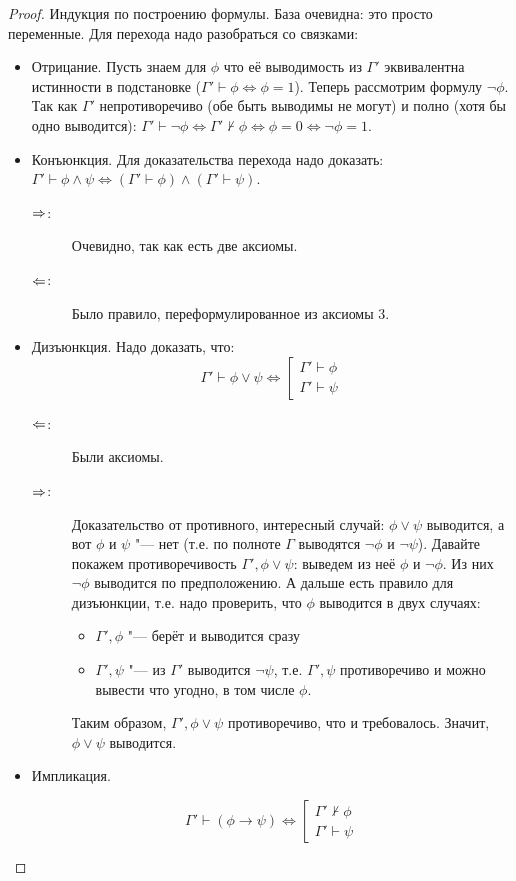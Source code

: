 \begin{proof}
	Индукция по построению формулы.
	База очевидна: это просто переменные.
	Для перехода надо разобраться со связками:
	\begin{itemize}
		\item
			Отрицание.
			Пусть знаем для $\phi$ что её выводимость из $\Gamma'$ эквивалентна истинности в подстановке ($\Gamma' \vdash \phi \iff \phi = 1$).
			Теперь рассмотрим формулу $\lnot \phi$.
			Так как $\Gamma'$ непротиворечиво (обе быть выводимы не могут) и полно (хотя бы одно выводится): $\Gamma' \vdash \lnot \phi \iff \Gamma' \nvdash \phi \iff \phi = 0 \iff \lnot \phi = 1$.
		\item
			Конъюнкция.
			Для доказательства перехода надо доказать:
			$\Gamma' \vdash \phi \land \psi \iff (\Gamma' \vdash \phi) \land (\Gamma' \vdash \psi)$.
			\begin{description}
			\item[$\Rightarrow$:]
				Очевидно, так как есть две аксиомы.
			\item[$\Leftarrow$:]
				Было правило, переформулированное из аксиомы 3.
			\end{description}
		\item
			Дизъюнкция.
			Надо доказать, что:
			\[
				\Gamma' \vdash \phi \lor \psi \iff
				\left[
					\begin{array}{l}
					\Gamma' \vdash \phi \\
					\Gamma' \vdash \psi
					\end{array}
				\right.
			\]
			\begin{description}
			\item[$\Leftarrow$:]
				Были аксиомы.
			\item[$\Rightarrow$:]
				Доказательство от противного, интересный случай:
				$\phi \lor \psi$ выводится, а вот $\phi$ и $\psi$ "--- нет (т.е. по полноте $\Gamma$ выводятся $\lnot \phi$ и $\lnot \psi$).
				Давайте покажем противоречивость $\Gamma', \phi \lor \psi$: выведем из неё $\phi$ и $\lnot \phi$.
				Из них $\lnot \phi$ выводится по предположению.
				А дальше есть правило для дизъюнкции, т.е. надо проверить, что $\phi$ выводится в двух случаях:
				\begin{itemize}
					\item $\Gamma', \phi$ "--- берёт и выводится сразу
					\item $\Gamma', \psi$ "--- из $\Gamma'$ выводится $\lnot \psi$, т.е. $\Gamma', \psi$ противоречиво и можно вывести что угодно, в том числе $\phi$.
				\end{itemize}
				Таким образом, $\Gamma', \phi \lor \psi$ противоречиво, что и требовалось.
				Значит, $\phi \lor \psi$ выводится.
			\end{description}
		\item
			Импликация.
			\begin{Exercise}
				\[
				\Gamma' \vdash (\phi \to \psi) \iff
				\left[
					\begin{array}{l}
					\Gamma' \nvdash \phi \\
					\Gamma' \vdash \psi
					\end{array}
				\right.
				\]
			\end{Exercise}
	\end{itemize}
\end{proof}

